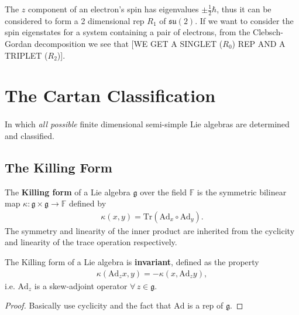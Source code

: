 \documentclass[11pt,fleqn]{article}
\renewenvironment{prop}{\begin{pBox}\begin{propT}}{\end{propT}\end{pBox}}
\begin{document}
\begin{example}
	The $z$ component of an electron's spin has eigenvalues $\pm \tfrac{1}{2}\hbar $, thus it can be considered to form a 2 dimensional rep $R_1$ of $\mathfrak{su}(2)$. If we want to consider the spin eigenstates for a system containing a pair of electrons, from the Clebsch-Gordan decomposition we see that [WE GET A SINGLET ($R_0$) REP AND A TRIPLET ($R_2$)].
\end{example}

\section{The Cartan Classification}
\paragraph{} In which \textit{all possible} finite dimensional semi-simple Lie algebras are determined and classified.

\subsection{The Killing Form}

\begin{definition}
	The \textbf{Killing form} of a Lie algebra $\mathfrak{g}$ over the field $\mathbb{F}$ is the symmetric bilinear map $\kappa : \mathfrak{g} \times \mathfrak{g} \to \mathbb{F}$ defined by
		\begin{align}
			\kappa(x,y) = \text{Tr}\left(\text{Ad}_x \circ \text{Ad}_y \right).
		\end{align}
	The symmetry and linearity of the inner product are inherited from the cyclicity and linearity of the trace operation respectively.
\end{definition}

\begin{prop}
	The Killing form of a Lie algebra is \textbf{invariant}, defined as the property
		\begin{align}
			\kappa ( \text{Ad}_z x,y) = - \kappa( x, \text{Ad}_z y),
		\end{align}
	i.e. $\text{Ad}_z$ is a skew-adjoint operator $\forall \, z \in \mathfrak{g}$.
\end{prop}
\begin{proof}
	Basically use cyclicity and the fact that $\text{Ad}$ is a rep of $\mathfrak{g}$. 
\end{proof}
\end{document}
